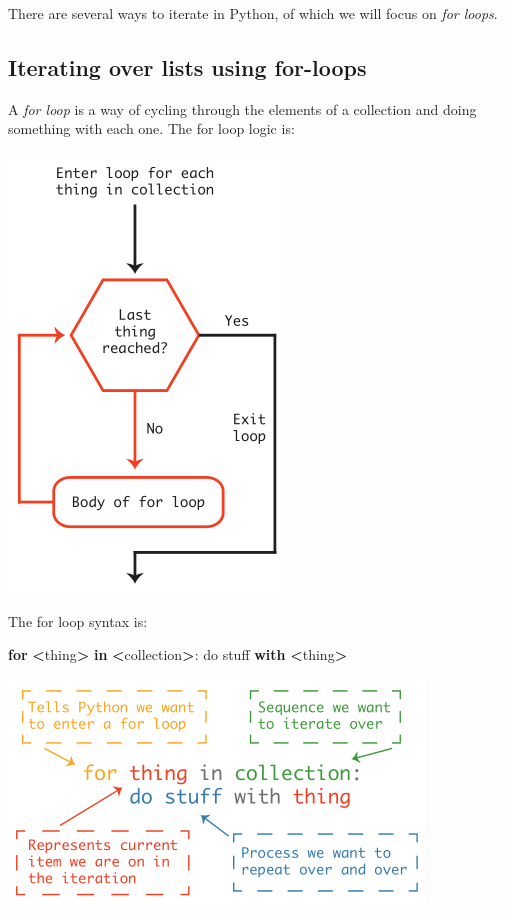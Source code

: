 \documentclass[]{book}
\newenvironment{Shaded}{\begin{snugshade}}{\end{snugshade}}
\newcommand{\ControlFlowTok}[1]{\textcolor[rgb]{0.13,0.29,0.53}{\textbf{#1}}}
\newcommand{\KeywordTok}[1]{\textcolor[rgb]{0.13,0.29,0.53}{\textbf{#1}}}
\newcommand{\NormalTok}[1]{#1}
\newcommand{\OperatorTok}[1]{\textcolor[rgb]{0.81,0.36,0.00}{\textbf{#1}}}
\begin{document}
There are several ways to iterate in Python, of which we will focus on \emph{for loops}.

\hypertarget{iterating-over-lists-using-for-loops}{%
\subsection{Iterating over lists using for-loops}\label{iterating-over-lists-using-for-loops}}

A \emph{for loop} is a way of cycling through the elements of a collection and doing something with each one. The for loop logic is:

\includegraphics{Python/PythonIntro/images/for_loop_pic_small.png}

The for loop syntax is:

\begin{Shaded}
\begin{Highlighting}[]
\ControlFlowTok{for} \OperatorTok{<}\NormalTok{thing}\OperatorTok{>} \KeywordTok{in} \OperatorTok{<}\NormalTok{collection}\OperatorTok{>}\NormalTok{:}
\NormalTok{    do stuff }\ControlFlowTok{with} \OperatorTok{<}\NormalTok{thing}\OperatorTok{>}
\end{Highlighting}
\end{Shaded}

\includegraphics{Python/PythonIntro/images/python_for_loop_small.png}
\end{document}

